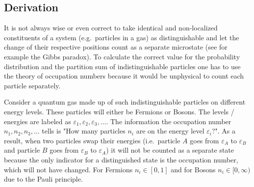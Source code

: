 \documentclass[a4paper,10pt]{article}
\numberwithin{equation}{section}
\begin{document}
\begin{multicols}{2}
\subsection{Derivation}
It is not always wise or even correct to take identical and non-localized constituents of a system (e.g.\ particles in a gas) as distinguishable and let the change of their respective positions count as a separate microstate (see for example the Gibbs paradox).
To calculate the correct value for the probability distribution and the partition sum of indistinguishable particles one has to use the theory of occupation numbers because it would be unphysical to count each particle separately.

Consider a quantum gas made up of such indistinguishable particles on different energy levels.
These particles will either be Fermions or Bosons.
The levels / energies are labeled as $\varepsilon _1,\varepsilon _2,\varepsilon _3,\hdots $.
The information the occupation number $n_1,n_2,n_3,\hdots $ tells is "How many particles $n_i$ are on the energy level $\varepsilon _i$?".
As a result, when two particles swap their energies (i.e.\ particle $A$ goes from $\varepsilon _A$ to $\varepsilon _B$ and particle $B$ goes from $\varepsilon _B$ to $\varepsilon _A$) it will not be counted as a separate state because the only indicator for a distinguished state is the occupation number, which will not have changed.
For Fermions $n_i  \in \left[0,1\right]$ and for Bosons $n_i  \in [0,\infty)$ due to the Pauli principle.


\end{multicols}
\end{document}
